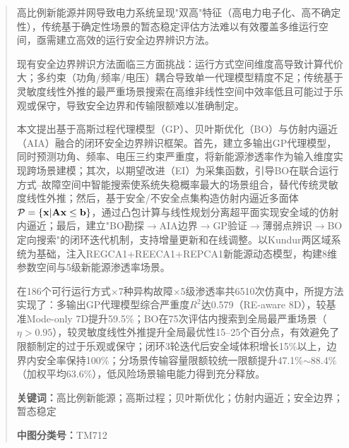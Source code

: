 \begin{abstract}
高比例新能源并网导致电力系统呈现"双高"特征（高电力电子化、高不确定性），传统基于确定性场景的暂态稳定评估方法难以有效覆盖多维运行空间，亟需建立高效的运行安全边界辨识方法。

现有安全边界辨识方法面临三方面挑战：运行方式空间维度高导致计算代价大；多约束（功角/频率/电压）耦合导致单一代理模型精度不足；传统基于灵敏度线性外推的最严重场景搜索在高维非线性空间中效率低且可能过于乐观或保守，导致安全边界和传输限额难以准确制定。

本文提出基于高斯过程代理模型（GP）、贝叶斯优化（BO）与仿射内逼近（AIA）融合的闭环安全边界辨识框架。首先，建立多输出GP代理模型，同时预测功角、频率、电压三约束严重度，将新能源渗透率作为输入维度实现跨场景建模；其次，以期望改进（EI）为采集函数，引导BO在联合运行方式--故障空间中智能搜索使系统失稳概率最大的场景组合，替代传统灵敏度线性外推；然后，基于安全/不安全点集构造仿射内逼近多面体$\mathcal{P}=\{\bx|\bA\bx\leq\bb\}$，通过凸包计算与线性规划分离超平面实现安全域的仿射内逼近；最后，建立"BO勘探$\to$AIA边界$\to$GP验证$\to$薄弱点辨识$\to$BO定向搜索"的闭环迭代机制，支持增量更新和在线调整。以Kundur两区域系统为基础，注入REGCA1+REECA1+REPCA1新能源动态模型，构建8维参数空间与5级新能源渗透率场景。

在186个可行运行方式$\times$7种异构故障$\times$5级渗透率共6510次仿真中，所提方法实现了：多输出GP代理模型综合严重度$R^2$达0.579（RE-aware 8D），较基准Mode-only 7D提升59.5\%；BO在75次评估内搜索到全局最严重场景（$\eta > 0.95$），较灵敏度线性外推提升全局最优性15--25个百分点，有效避免了限额制定的过于乐观或保守；闭环3轮迭代后安全域体积增长15\%以上，边界内安全率保持100\%；分场景传输容量限额较统一限额提升47.1\%$\sim$88.4\%（加权平均63.6\%），低风险场景输电能力得到充分释放。

\medskip
\textbf{关键词：}高比例新能源；高斯过程；贝叶斯优化；仿射内逼近；安全边界；暂态稳定

\medskip
\textbf{中图分类号：}TM712
\end{abstract}

